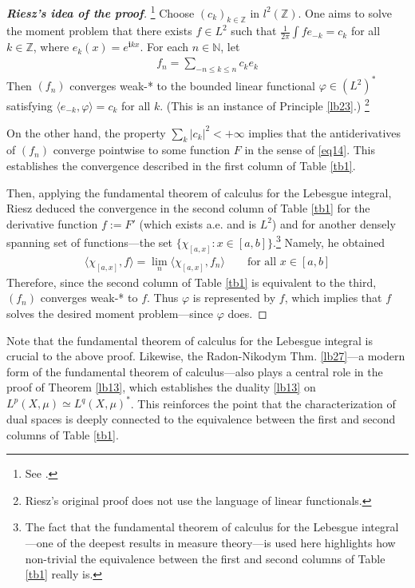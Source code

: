 \documentclass[12pt,b5paper,notitlepage]{article}
\theoremstyle{definition}
\theoremstyle{plain}
\newcommand{\bk}[1]{\langle {#1}\rangle}
\newcommand{\im}{\mathbf{i}}
\newcommand{\Nbb}{\mathbb N}
\newcommand{\Zbb}{\mathbb Z}
\numberwithin{equation}{section}
\begin{document}
\begin{proof}[\textbf{Riesz's idea of the proof}]\footnote{See \cite[Ch. 6]{Haw-L}.}
Choose $(c_k)_{k\in\Zbb}$ in $l^2(\Zbb)$. One aims to solve the moment problem that there exists $f\in L^2$ such that $\frac{1}{2\pi}\int fe_{-k}=c_k$ for all $k\in\Zbb$, where $e_k(x)=e^{\im kx}$. For each $n\in\Nbb$, let
\begin{align*}
f_n=\sum_{-n\leq k\leq n}c_ke_k
\end{align*}
Then $(f_n)$ converges weak-* to the bounded linear functional $\varphi\in (L^2)^*$ satisfying $\bk{e_{-k},\varphi}=c_k$ for all $k$. (This is an instance of Principle \ref{lb23}.) \footnote{Riesz's original proof does not use the language of linear functionals.} 

On the other hand, the property $\sum_k|c_k|^2<+\infty$ implies that the antiderivatives of $(f_n)$ converge pointwise to some function $F$ in the sense of \eqref{eq14}. This establishes the convergence described in the first column of Table \ref{tb1}. 

Then, applying the fundamental theorem of calculus for the Lebesgue integral, Riesz deduced the convergence in the second column of Table \ref{tb1} for the derivative function $f:=F'$ (which exists a.e. and is $L^2$) and for another densely spanning set of functions---the set $\{\chi_{[a,x]}:x\in[a,b]\}$.\footnote{The fact that the fundamental theorem of calculus for the Lebesgue integral---one of the deepest results in measure theory---is used here highlights how non-trivial the equivalence between the first and second columns of Table \ref{tb1} really is.} Namely, he obtained
\begin{align*}
\bk{\chi_{[a,x]},f}=\lim_n\bk{\chi_{[a,x]},f_n}\qquad\text{for all }x\in[a,b]
\end{align*}
Therefore, since the second column of Table \ref{tb1} is equivalent to the third, $(f_n)$ converges weak-* to $f$. Thus $\varphi$ is represented by $f$, which implies that $f$ solves the desired moment problem---since $\varphi$ does.
\end{proof}

Note that the fundamental theorem of calculus for the Lebesgue integral is crucial to the above proof. Likewise, the Radon-Nikodym Thm. \ref{lb27}---a modern form of the fundamental theorem of calculus---also plays a central role in the proof of Theorem \ref{lb13}, which establishes the duality \ref{lb13} on $L^p(X,\mu)\simeq L^q(X,\mu)^*$. This reinforces the point that the characterization of dual spaces is deeply connected to the equivalence between the first and second columns of Table \ref{tb1}. 
\end{document}
